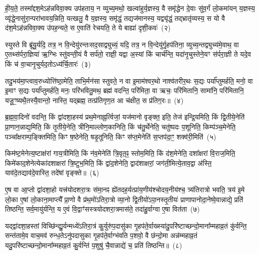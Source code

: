 ही॒य॒ते॒ तस्मा᳚द्दश॒मे\-ऽह॑न्नविवा॒क्य उप॑हताय॒ न व्युच्य॒मथो॒ खल्वा॑हुर्य॒ज्ञस्य॒ वै समृ॑द्धेन दे॒वाः सु॑व॒र्गं लो॒कमा॑यन् य॒ज्ञस्य॒ व्यृ॑द्धे॒नासु॑रा॒न्परा॑भावय॒न्निति॒ यत्खलु॒ वै य॒ज्ञस्य॒ समृ॑द्धं॒ तद्यज॑मानस्य॒ यद्व्यृ॑द्धं॒ तद्भ्रातृ॑व्यस्य॒ स यो वै द॑श॒मे\-ऽह॑न्नविवा॒क्य उ॑पह॒न्यते॒ स ए॒वाति॑ रेचयति॒ ते ये बाह्या॑ दृशी॒कवः॑~(२)

स्युस्ते वि ब्रू॑यु॒र्यदि॒ तत्र॒ न वि॒न्देयु॑रन्तःसद॒साद्व्युच्यं॒ यदि॒ तत्र॒ न वि॒न्देयु॑र्गृ॒हप॑तिना॒ व्युच्य॒न्तद्व्युच्य॑मे॒वाथ॒ वा ए॒तथ्स॑र्परा॒ज्ञिया॑ ऋ॒ग्भिः स्तु॑वन्ती॒यं वै सर्प॑तो॒ राज्ञी॒ यद्वा अ॒स्यां किं चार्च॑न्ति॒ यदा॑नृ॒चुस्तेने॒यꣳ स॑र्परा॒ज्ञी ते यदे॒व किं च॑ वा॒चानृ॒चुर्यद॒तो\-ऽध्य॑र्चि॒तारः॑~(३)

तदु॒भय॑मा॒प्त्वाव॒रुध्योत्ति॑ष्ठा॒मेति॒ ताभि॒र्मन॑सा स्तुवते॒ न वा इ॒माम॑श्वर॒थो नाश्व॑तरीर॒थः स॒द्यः पर्या᳚प्तुमर्\mbox{}हति॒ मनो॒ वा इ॒माꣳ स॒द्यः पर्या᳚प्तुमर्\mbox{}हति॒ मनः॒ परि॑भवितु॒मथ॒ ब्रह्म॑ वदन्ति॒ परि॑मिता॒ वा ऋचः॒ परि॑मितानि॒ सामा॑नि॒ परि॑मितानि॒ यजू॒ꣳ॒ष्यथै॒तस्यै॒वान्तो॒ नास्ति॒ यद्ब्रह्म॒ तत्प्र॑तिगृण॒त आ च॑क्षीत॒ स प्र॑तिग॒रः॥~(४)

{\anuvakamend[{व्याह॒ स दृ॑शी॒कवो᳚\-ऽर्चि॒तारः॒ स एक॑ञ्च}]}%

ब्र॒ह्म॒वा॒दिनो॑ वदन्ति॒ किं द्वा॑दशा॒हस्य॑ प्रथ॒मेनाह्न॒र्त्विजां॒ यज॑मानो वृङ्क्त॒ इति॒ तेज॑ इन्द्रि॒यमिति॒ किं द्वि॒तीये॒नेति॑ प्रा॒णान॒न्नाद्य॒मिति॒ किं तृ॒तीये॒नेति॒ त्रीनि॒माल्लोण॒कानिति॒ किं च॑तु॒र्थेनेति॒ चतु॑ष्पदः प॒शूनिति॒ किम्प॑ञ्च॒मेनेति॒ पञ्चा᳚क्षराम्प॒ङ्क्तिमिति॒ किꣳ ष॒ष्ठेनेति॒ षडृ॒तूनिति॒ किꣳ स॑प्त॒मेनेति॑ स॒प्तप॑दा॒ꣳ॒ शक्व॑री॒मिति॑~(५)

किम॑ष्ट॒मेनेत्य॒ष्टाक्ष॑रां गाय॒त्रीमिति॒ किं न॑व॒मेनेति॑ त्रि॒वृत॒ꣴ॒ स्तोम॒मिति॒ किं द॑श॒मेनेति॒ दशा᳚क्षरां वि॒राज॒मिति॒ किमे॑काद॒शेनेत्येका॑\-दशाक्षरां त्रि॒ष्टुभ॒मिति॒ किं द्वा॑द॒शेनेति॒ द्वाद॑शाक्षरां॒ जग॑ती॒मित्ये॒ताव॒द्वा अ॑स्ति॒ याव॑दे॒तद्याव॑दे॒वास्ति॒ तदे॑षां वृङ्क्ते॥~(६)

{\anuvakamend[{शक्व॑री॒मित्येक॑चत्वारिꣳशच्च}]}%

ए॒ष वा आ॒प्तो द्वा॑दशा॒हो यत्त्र॑योदशरा॒त्रः स॑मा॒नꣴ ह्ये॑तदह॒र्यत्प्रा॑य॒णीय॑श्चोदय॒नीय॑श्च॒ त्र्य॑तिरात्रो भवति॒ त्रय॑ इ॒मे लो॒का ए॒षां लो॒काना॒माप्त्यै᳚ प्रा॒णो वै प्र॑थ॒मो॑\-ऽतिरा॒त्रो व्या॒नो द्वि॒तीयो॑\-ऽपा॒नस्तृ॒तीयः॑ प्राणापानोदा॒नेष्वे॒वान्नाद्ये॒ प्रति॑ तिष्ठन्ति॒ सर्व॒मायु॑र्यन्ति॒ य ए॒वं वि॒द्वाꣳ॑सस्त्रयोदशरा॒त्रमास॑ते॒ तदा॑हु॒र्वाग्वा ए॒षा वित॑ता~(७)

यद्द्वा॑दशा॒हस्तां विच्छि॑न्द्यु॒र्यन्मध्ये॑\-ऽतिरा॒त्रं कु॒र्युरु॑प॒दासु॑का गृ॒हप॑ते॒र्वाख्स्या॑दु॒परि॑ष्टाच्छन्दो॒माना᳚म्महाव्र॒तं कु॑र्वन्ति॒ सन्त॑तामे॒व वाच॒मव॑ रुन्ध॒ते\-ऽनु॑पदासुका गृ॒हप॑ते॒र्वाग्भ॑वति प॒शवो॒ वै छ॑न्दो॒मा अन्न॑म्महाव्र॒तं यदु॒परि॑ष्टाच्छन्दो॒माना᳚\-म्महाव्र॒तं कु॒र्वन्ति॑ प॒शुषु॑ चै॒वान्नाद्ये॑ च॒ प्रति॑ तिष्ठन्ति॥~(८)

